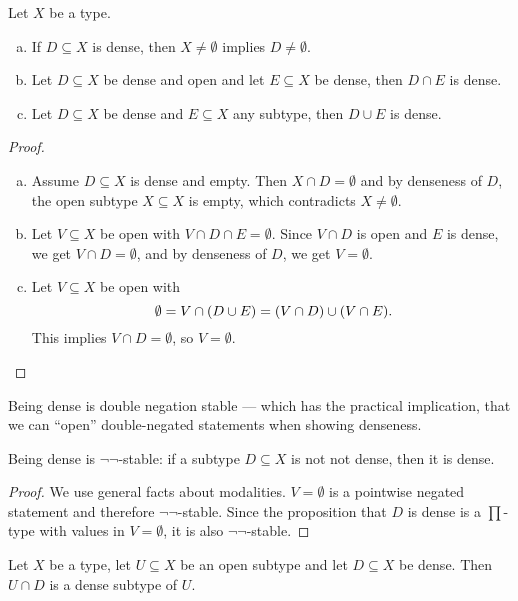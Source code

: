 \begin{lemma}%
  \label{basic-dense-operations}
  Let $X$ be a type.
  \begin{enumerate}[(a)]
  \item If $D\subseteq X$ is dense, then $X\neq \emptyset$ implies $D\neq \emptyset$.
  \item Let $D \subseteq X$ be dense and open and let $E \subseteq X$ be dense,
    then $D\cap E$ is dense.
  \item Let $D\subseteq X$ be dense and $E\subseteq X$ any subtype, then $D\cup E$ is dense.
  \end{enumerate}
\end{lemma}

\begin{proof}
  \begin{enumerate}[(a)]
  \item Assume $D\subseteq X$ is dense and empty.
    Then $X\cap D=\emptyset$ and by denseness of $D$,
    the open subtype $X \subseteq X$ is empty,
    which contradicts $X\neq \emptyset$.
  \item Let $V\subseteq X$ be open with $V\cap D\cap E=\emptyset$.
    Since $V \cap D$ is open and $E$ is dense,
    we get $V \cap D = \emptyset$,
    and by denseness of $D$, we get $V=\emptyset$.
  \item Let $V\subseteq X$ be open with
    \[
      \emptyset=V\cap (D\cup E)=(V\cap D) \cup (V\cap E)\rlap{.}
    \]
    This implies $V\cap D=\emptyset$,
    so $V=\emptyset$.
  \end{enumerate}
\end{proof}

Being dense is double negation stable ---
which has the practical implication,
that we can ``open'' double-negated statements when showing denseness.

\begin{proposition}%
  \label{dense-double-negation-stable}
  Being dense is $\neg\neg$-stable:
  if a subtype $D \subseteq X$ is not not dense, then it is dense.
\end{proposition}

\begin{proof}
  We use general facts about modalities.
  $V=\emptyset$ is a pointwise negated statement and therefore $\neg\neg$-stable.
  Since the proposition that $D$ is dense is a $\prod$-type with values in $V=\emptyset$,
  it is also $\neg\neg$-stable.
\end{proof}

\begin{lemma}%
  \label{restrict-dense-to-open}
  Let $X$ be a type,
  let $U \subseteq X$ be an open subtype
  and let $D \subseteq X$ be dense.
  Then $U \cap D$ is a dense subtype of $U$.
\end{lemma}

